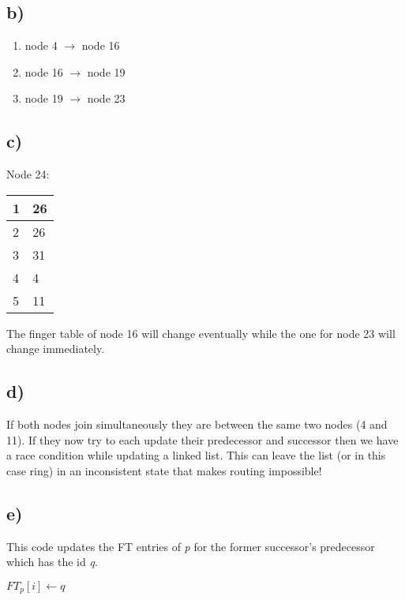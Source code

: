 \documentclass{scrartcl}
\begin{document}
\subsection*{b)}
\begin{enumerate}
	\item node 4 $ \rightarrow $ node 16
	\item node 16 $ \rightarrow $ node 19
	\item node 19 $ \rightarrow $ node 23
\end{enumerate}

\subsection*{c)}
\begin{minipage}[t]{.25\linewidth}
	\centering
    Node 24:\\
	\begin{tabular}{|l|l|}
		\hline
		1 & 26 \\ \hline
		2 & 26 \\ \hline
		3 & 31 \\ \hline
		4 & 4 \\ \hline
		5 & 11 \\ \hline
	\end{tabular}
\end{minipage}

The finger table of node 16 will change eventually while the one for node 23 will change immediately.

\subsection*{d)}
If both nodes join simultaneously they are between the same two nodes (4 and 11). 
If they now try to each update their predecessor and successor then we have a race condition while updating a linked list. 
This can leave the list (or in this case ring) in an inconsistent state that makes routing impossible!

\subsection*{e)}

This code updates the FT entries of \textit{p} for the former successor's predecessor which has the id \textit{q}.

\begin{algorithm}
\begin{algorithmic}
	   \State $FT_p[i] \gets q$
	\EndFor
\end{algorithmic}
\end{algorithm}
\end{document}
